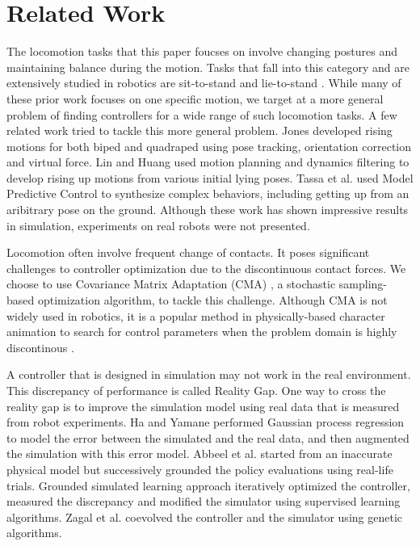 \section{Related Work}
The locomotion tasks that this paper foucses on involve changing postures and maintaining balance during the motion. Tasks that fall into this category and are extensively studied in robotics are sit-to-stand \cite{Faloutsos:2003,Iida:2004,Pchelkin:2010,Mistry:2010} and lie-to-stand \cite{morimoto:1998,Faloutsos:2001,Hirukawa:2005,Kanehiro:2007}. While many of these prior work focuses on one specific motion, we target at a more general problem of finding controllers for a wide range of such locomotion tasks. A few related work tried to tackle this more general problem. Jones \cite{jones:2011} developed rising motions for both biped and quadraped using pose tracking, orientation correction and virtual force. Lin and Huang \cite{lin:2012} used motion planning and dynamics filtering to develop rising up motions from various initial lying poses. Tassa et al. \cite{tassa:2012} used Model Predictive Control to synthesize complex behaviors, including getting up from an aribitrary pose on the ground. Although these work has shown impressive results in simulation, experiments on real robots were not presented.

Locomotion often involve frequent change of contacts. It poses significant challenges to controller optimization due to the discontinuous contact forces. We choose to use Covariance Matrix Adaptation (CMA) \cite{Hansen:2009}, a stochastic sampling-based optimization algorithm, to tackle this challenge. Although CMA is not widely used in robotics, it is a popular method in physically-based character animation to search for control parameters when the problem domain is highly discontinous \cite{Wu:2010, Wang:2010, Tan:2014}.

A controller that is designed in simulation may not work in the real environment. This discrepancy of performance is called Reality Gap. One way to cross the reality gap is to improve the simulation model using real data that is measured from robot experiments. Ha and Yamane \cite{HA:2015} performed Gaussian process regression to model the error between the simulated and the real data, and then augmented the simulation with this error model. Abbeel et al. \cite{Abbeel:2006} started from an inaccurate physical model but successively grounded the policy evaluations using real-life trials. Grounded simulated learning approach \cite{Farchy:2013} iteratively optimized the controller, measured the discrepancy and modified the simulator using supervised learning algorithms. Zagal et al. \cite{zagal2004} coevolved the controller and the simulator using genetic algorithms.

